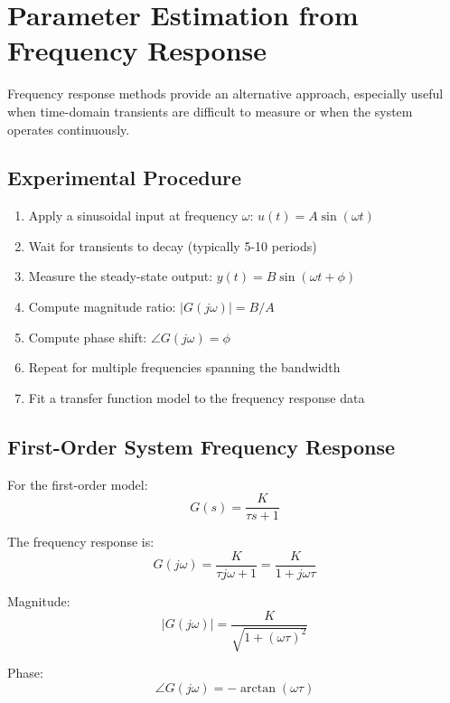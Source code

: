 \section{Parameter Estimation from Frequency Response}

Frequency response methods provide an alternative approach, especially useful when time-domain transients are difficult to measure or when the system operates continuously.

\subsection{Experimental Procedure}

\begin{enumerate}
    \item Apply a sinusoidal input at frequency $\omega$: $u(t) = A\sin(\omega t)$
    \item Wait for transients to decay (typically 5-10 periods)
    \item Measure the steady-state output: $y(t) = B\sin(\omega t + \phi)$
    \item Compute magnitude ratio: $|G(j\omega)| = B/A$
    \item Compute phase shift: $\angle G(j\omega) = \phi$
    \item Repeat for multiple frequencies spanning the bandwidth
    \item Fit a transfer function model to the frequency response data
\end{enumerate}

\subsection{First-Order System Frequency Response}

For the first-order model:
\begin{equation}
G(s) = \frac{K}{\tau s + 1}
\end{equation}

The frequency response is:
\begin{equation}
G(j\omega) = \frac{K}{\tau j\omega + 1} = \frac{K}{1 + j\omega\tau}
\end{equation}

Magnitude:
\begin{equation}
|G(j\omega)| = \frac{K}{\sqrt{1 + (\omega\tau)^2}}
\end{equation}

Phase:
\begin{equation}
\angle G(j\omega) = -\arctan(\omega\tau)
\end{equation}

